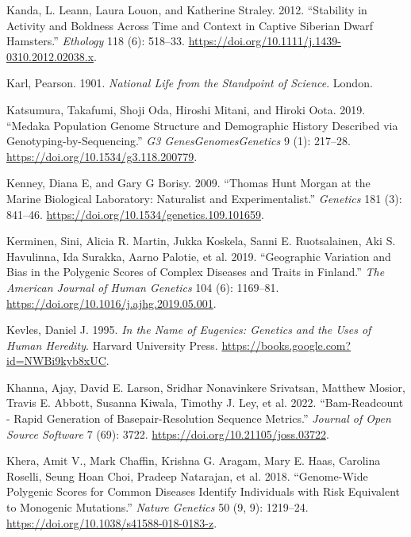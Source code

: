 \documentclass[
]{book}
\newlength{\cslhangindent}
\newlength{\cslentryspacingunit} %
\newenvironment{CSLReferences}[2] %
 {%
  \setlength{\parindent}{0pt}
  \ifodd #1
  \let\oldpar\par
  \def\par{\hangindent=\cslhangindent\oldpar}
  \fi
  \setlength{\parskip}{#2\cslentryspacingunit}
 }%
 {}
\begin{document}
\begin{CSLReferences}{1}{0}
\leavevmode{}%
Kanda, L. Leann, Laura Louon, and Katherine Straley. 2012. {``Stability in {Activity} and {Boldness Across Time} and {Context} in {Captive Siberian Dwarf Hamsters}.''} \emph{Ethology} 118 (6): 518--33. \url{https://doi.org/10.1111/j.1439-0310.2012.02038.x}.

\leavevmode{}%
Karl, Pearson. 1901. \emph{National {Life} from the Standpoint of {Science}}. {London}.

\leavevmode{}%
Katsumura, Takafumi, Shoji Oda, Hiroshi Mitani, and Hiroki Oota. 2019. {``Medaka {Population Genome Structure} and {Demographic History Described} via {Genotyping-by-Sequencing}.''} \emph{G3 Genes\textbar Genomes\textbar Genetics} 9 (1): 217--28. \url{https://doi.org/10.1534/g3.118.200779}.

\leavevmode{}%
Kenney, Diana E, and Gary G Borisy. 2009. {``Thomas {Hunt Morgan} at the {Marine Biological Laboratory}: {Naturalist} and {Experimentalist}.''} \emph{Genetics} 181 (3): 841--46. \url{https://doi.org/10.1534/genetics.109.101659}.

\leavevmode{}%
Kerminen, Sini, Alicia R. Martin, Jukka Koskela, Sanni E. Ruotsalainen, Aki S. Havulinna, Ida Surakka, Aarno Palotie, et al. 2019. {``Geographic {Variation} and {Bias} in the {Polygenic Scores} of {Complex Diseases} and {Traits} in {Finland}.''} \emph{The American Journal of Human Genetics} 104 (6): 1169--81. \url{https://doi.org/10.1016/j.ajhg.2019.05.001}.

\leavevmode{}%
Kevles, Daniel J. 1995. \emph{In the {Name} of {Eugenics}: {Genetics} and the {Uses} of {Human Heredity}}. {Harvard University Press}. \url{https://books.google.com?id=NWBi9kyb8xUC}.

\leavevmode{}%
Khanna, Ajay, David E. Larson, Sridhar Nonavinkere Srivatsan, Matthew Mosior, Travis E. Abbott, Susanna Kiwala, Timothy J. Ley, et al. 2022. {``Bam-Readcount - Rapid Generation of Basepair-Resolution Sequence Metrics.''} \emph{Journal of Open Source Software} 7 (69): 3722. \url{https://doi.org/10.21105/joss.03722}.

\leavevmode{}%
Khera, Amit V., Mark Chaffin, Krishna G. Aragam, Mary E. Haas, Carolina Roselli, Seung Hoan Choi, Pradeep Natarajan, et al. 2018. {``Genome-Wide Polygenic Scores for Common Diseases Identify Individuals with Risk Equivalent to Monogenic Mutations.''} \emph{Nature Genetics} 50 (9, 9): 1219--24. \url{https://doi.org/10.1038/s41588-018-0183-z}.


\end{CSLReferences}
\end{document}
